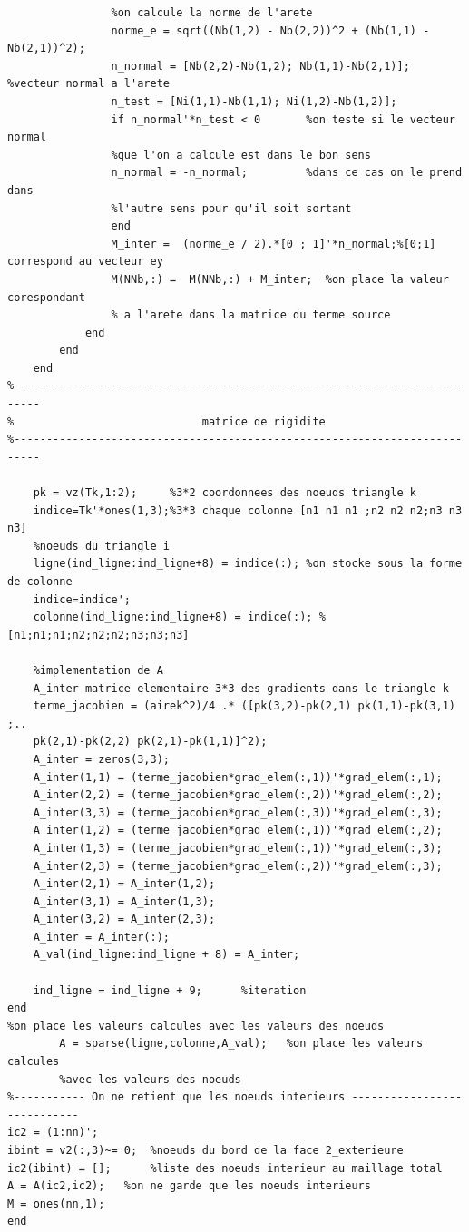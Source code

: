 \documentclass[a4paper,12pt,titlepage]{report}
\begin{document}
\begin{onehalfspace}
\begin{appendix}
\begin{verbatim}
           		%on calcule la norme de l'arete
          	  	norme_e = sqrt((Nb(1,2) - Nb(2,2))^2 + (Nb(1,1) - Nb(2,1))^2);  
           		n_normal = [Nb(2,2)-Nb(1,2); Nb(1,1)-Nb(2,1)];  %vecteur normal a l'arete
            	n_test = [Ni(1,1)-Nb(1,1); Ni(1,2)-Nb(1,2)];
   	        	if n_normal'*n_test < 0       %on teste si le vecteur normal 
   	        	%que l'on a calcule est dans le bon sens
            	n_normal = -n_normal;         %dans ce cas on le prend dans 
            	%l'autre sens pour qu'il soit sortant
         		end
     			M_inter =  (norme_e / 2).*[0 ; 1]'*n_normal;%[0;1] correspond au vecteur ey
    			M(NNb,:) =  M(NNb,:) + M_inter;  %on place la valeur corespondant
    			% a l'arete dans la matrice du terme source 
        	end                                                              
        end
    end
%--------------------------------------------------------------------------
%                             matrice de rigidite
%--------------------------------------------------------------------------                     

	pk = vz(Tk,1:2);     %3*2 coordonnees des noeuds triangle k 
    indice=Tk'*ones(1,3);%3*3 chaque colonne [n1 n1 n1 ;n2 n2 n2;n3 n3 n3] 
    %noeuds du triangle i
    ligne(ind_ligne:ind_ligne+8) = indice(:); %on stocke sous la forme de colonne
    indice=indice';                                 
   	colonne(ind_ligne:ind_ligne+8) = indice(:); %[n1;n1;n1;n2;n2;n2;n3;n3;n3]
       
    %implementation de A
    A_inter matrice elementaire 3*3 des gradients dans le triangle k
    terme_jacobien = (airek^2)/4 .* ([pk(3,2)-pk(2,1) pk(1,1)-pk(3,1) ;..
    pk(2,1)-pk(2,2) pk(2,1)-pk(1,1)]^2);
    A_inter = zeros(3,3);
    A_inter(1,1) = (terme_jacobien*grad_elem(:,1))'*grad_elem(:,1);
    A_inter(2,2) = (terme_jacobien*grad_elem(:,2))'*grad_elem(:,2);
    A_inter(3,3) = (terme_jacobien*grad_elem(:,3))'*grad_elem(:,3);
    A_inter(1,2) = (terme_jacobien*grad_elem(:,1))'*grad_elem(:,2);
    A_inter(1,3) = (terme_jacobien*grad_elem(:,1))'*grad_elem(:,3);
    A_inter(2,3) = (terme_jacobien*grad_elem(:,2))'*grad_elem(:,3);
    A_inter(2,1) = A_inter(1,2); 
    A_inter(3,1) = A_inter(1,3); 
    A_inter(3,2) = A_inter(2,3);        
    A_inter = A_inter(:);
    A_val(ind_ligne:ind_ligne + 8) = A_inter;
           
    ind_ligne = ind_ligne + 9;      %iteration
end
%on place les valeurs calcules avec les valeurs des noeuds
        A = sparse(ligne,colonne,A_val);   %on place les valeurs calcules 
        %avec les valeurs des noeuds
%----------- On ne retient que les noeuds interieurs ----------------------------
ic2 = (1:nn)';  
ibint = v2(:,3)~= 0;  %noeuds du bord de la face 2_exterieure
ic2(ibint) = [];      %liste des noeuds interieur au maillage total
A = A(ic2,ic2);   %on ne garde que les noeuds interieurs
M = ones(nn,1); 
end
\end{verbatim}


\end{appendix}
\end{onehalfspace}
\end{document}
